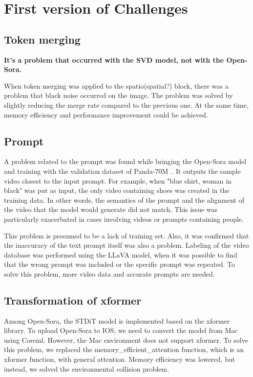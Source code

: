 \section{First version of Challenges}
\subsection{Token merging}
\textbf{It's a problem that occurred with the SVD model, not with the Open-Sora.}


When token merging was applied to the spatio(spatial?) block, there was a problem that black noise occurred on the image. The problem was solved by slightly reducing the merge rate compared to the previous one. At the same time, memory efficiency and performance improvement could be achieved.

\subsection{Prompt}
A problem related to the prompt was found while bringing the Open-Sora model and training with the validation dataset of Panda-70M~\cite{chen2024panda70m}. It outputs the sample video closest to the input prompt. For example, when "blue shirt, woman in black" was put as input, the only video containing shoes was created in the training data. In other words, the semantics of the prompt and the alignment of the video that the model would generate did not match. This issue was particularly exacerbated in cases involving videos or prompts containing people.

This problem is presumed to be a lack of training set. Also, it was confirmed that the inaccuracy of the text prompt itself was also a problem. Labeling of the video database was performed using the LLaVA model, when it was possible to find that the wrong prompt was included or the specific prompt was repeated. To solve this problem, more video data and accurate prompts are needed.

\subsection{Transformation of xformer}
Among Open-Sora, the STDiT model is implemented based on the xformer~\cite{xFormers2022} library. To upload Open-Sora to IOS, we need to convert the model from Mac using Coreml. However, the Mac environment does not support xformer. To solve this problem, we replaced the memory\_efficient\_attention function, which is an xformer function, with general attention. Memory efficiency was lowered, but instead, we solved the environmental collision problem.

